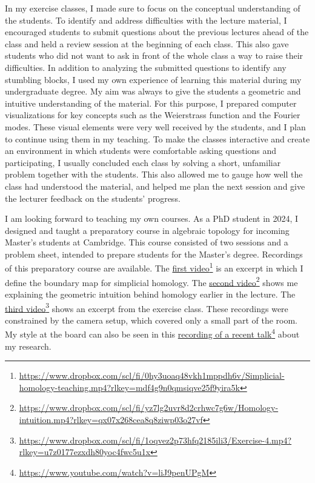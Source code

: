 In my exercise classes, I made sure to focus on the conceptual understanding of the students.
To identify and address difficulties with the lecture material,
I encouraged students
to submit questions about the previous lectures ahead of the class
and held a review session
at the beginning of each class.
This also gave students who did not want to ask in front of the whole class a way to raise their difficulties.
In addition to analyzing the submitted questions to identify any stumbling blocks,
I used my own experience of learning this material during my undergraduate degree.
My aim was always to give the students a geometric and intuitive understanding of the material.
For this purpose, I prepared computer visualizations for key concepts such as the Weierstrass function and the Fourier modes.
These visual elements were very well received by the students, and I plan to continue using them in my teaching.
To make the classes interactive and create an environment in which students were
comfortable asking questions and participating,
I usually concluded each class by solving a short, unfamiliar problem together with the students.
This also allowed me to gauge how well the class had understood the material, and helped me plan the next session and give the lecturer feedback on the students' progress.


I am looking forward to teaching my own courses.
As a PhD student in 2024, I designed and taught a preparatory course in algebraic topology for incoming Master's students at Cambridge. This course consisted of two sessions and a problem sheet, intended to prepare students for the Master's degree.
Recordings of this preparatory course are available. The \href{https://www.dropbox.com/scl/fi/0hy3uoaq48vkh1mppdh6v/Simplicial-homology-teaching.mp4?rlkey=mdf4g9n0qmsiqve25f9yira5k}{first video}\footnote{\url{https://www.dropbox.com/scl/fi/0hy3uoaq48vkh1mppdh6v/Simplicial-homology-teaching.mp4?rlkey=mdf4g9n0qmsiqve25f9yira5k}}
is an excerpt in which I define the boundary map for simplicial homology. The \href{https://www.dropbox.com/scl/fi/yz7lg2uvr8d2crhwc7g6w/Homology-intuition.mp4?rlkey=qx07x268cea8q8ziwp03o27vf}{second video}\footnote{\url{https://www.dropbox.com/scl/fi/yz7lg2uvr8d2crhwc7g6w/Homology-intuition.mp4?rlkey=qx07x268cea8q8ziwp03o27vf}}
shows me explaining the geometric intuition behind homology earlier in the lecture. The \href{https://www.dropbox.com/scl/fi/1oqvez2p73hfq2185ili3/Exercise-4.mp4?rlkey=u7z0177ezxdh80yoc4fwc5u1x}{third video}\footnote{\url{https://www.dropbox.com/scl/fi/1oqvez2p73hfq2185ili3/Exercise-4.mp4?rlkey=u7z0177ezxdh80yoc4fwc5u1x}} shows an excerpt from the exercise class. These recordings were constrained by the camera setup, which covered only a small part of the room. My style at the board can also be seen in this \href{https://www.youtube.com/watch?v=liJ9penUPgM}{recording of a recent talk}\footnote{\url{https://www.youtube.com/watch?v=liJ9penUPgM}} about my research.

